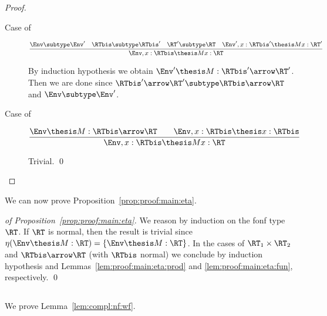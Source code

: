 \begin{proof}
\begin{description}
\item[Case of]
\[
\dfrac{
  \Env \subtype \Env'
  \quad
  \RTbis \subtype \RTbis'
  \quad 
  \RT' \subtype \RT
  \quad
  \Env', x:\RTbis' \thesis M x : \RT'}
  {\Env,x:\RTbis \thesis M x : \RT}
\]

By induction hypothesis we obtain
$\Env' \thesis M : \RTbis' \arrow \RT'$.
Then we are done since
$\RTbis' \arrow \RT' \subtype \RTbis \arrow \RT$
and $\Env \subtype \Env'$.

\item[Case of]
\[
\dfrac{\Env \thesis M : \RTbis \arrow \RT
  \qquad
  \Env, x: \RTbis \thesis x : \RTbis}
  {\Env, x: \RTbis \thesis M x : \RT}
\]

Trivial.
\qed
\end{description}
\end{proof}

We can now prove Proposition~\ref{prop:proof:main:eta}.

\begin{proof}[of Proposition~\ref{prop:proof:main:eta}]
We reason by induction on the fonf type $\RT$.
If $\RT$ is normal, then the result is trivial
since 
$\eta(\Env \thesis M : \RT) = \left\{ \Env \thesis M : \RT \right\}$.
In the cases of $\RT_1 \times \RT_2$
and $\RTbis \arrow \RT$ (with $\RTbis$ normal)
we conclude by induction hypothesis
and Lemmas~\ref{lem:proof:main:eta:prod} and \ref{lem:proof:main:eta:fun}, respectively.
\qed
\end{proof}





\subsection{}
\label{sec:proof:compl:general}

We prove Lemma~\ref{lem:compl:nf:wf}.

